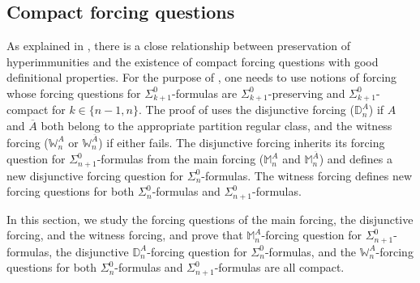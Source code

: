 \documentclass{article}
\def\NN{\mathbb{N}}
\def\DD{\mathbb{D}}
\def\WW{\mathbb{W}}
\def\MM{\mathbb{M}}
\newcommand{\qvdash}{\operatorname{{?}{\vdash}}}
\numberwithin{theorem}{section}
\theoremstyle{definition}
\newtheorem{remark}[theorem]{Remark}
\begin{document}
\subsection{Compact forcing questions}\label{sect:compact-forcing-questions}

As explained in , there is a close relationship between preservation of hyperimmunities and the existence of compact forcing questions with good definitional properties.
For the purpose of , one needs to use notions of forcing whose forcing questions for $\Sigma_{k+1}^0$-formulas
are $\Sigma^0_{k+1}$-preserving and $\Sigma^0_{k+1}$-compact for $k \in \{n-1, n\}$.
The proof of  uses the disjunctive forcing ($\DD^A_n$) if $A$ and $\overline{A}$ both belong to the appropriate partition regular class, and the witness forcing ($\WW^A_n$ or $\WW^{\overline{A}}_n$) if either fails. The disjunctive forcing inherits its forcing question for $\Sigma^0_{n+1}$-formulas from the main forcing ($\MM^A_n$ and $\MM^{\overline{A}}_n$) and defines a new disjunctive forcing question for $\Sigma^0_n$-formulas. The witness forcing defines new forcing questions for both $\Sigma^0_n$-formulas and $\Sigma^0_{n+1}$-formulas.

In this section, we study the forcing questions of the main forcing, the disjunctive forcing, and the witness forcing, and prove that $\MM^A_n$-forcing question for $\Sigma^0_{n+1}$-formulas, the disjunctive $\DD^A_n$-forcing question for $\Sigma^0_n$-formulas, and the $\WW^A_n$-forcing questions for both $\Sigma^0_n$-formulas and $\Sigma^0_{n+1}$-formulas are all compact.

\end{document}
